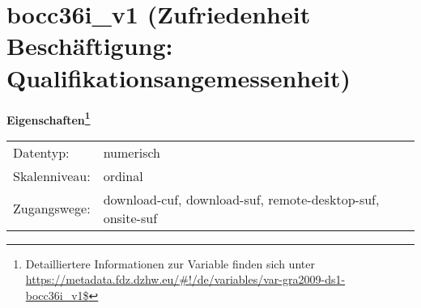 
    \setcounter{footnote}{0}

    \vspace*{-1.8cm}
	\section{bocc36i\_v1 (Zufriedenheit Beschäftigung: Qualifikationsangemessenheit)}
	\label{section:bocc36i_v1}



    \vspace*{0.5cm}
    \noindent\textbf{Eigenschaften\footnote{Detailliertere Informationen zur Variable finden sich unter
		\url{https://metadata.fdz.dzhw.eu/\#!/de/variables/var-gra2009-ds1-bocc36i_v1$}}}\\
	\begin{tabularx}{\hsize}{@{}lX}
	Datentyp: & numerisch \\
	Skalenniveau: & ordinal \\
	Zugangswege: &
	  download-cuf, 
	  download-suf, 
	  remote-desktop-suf, 
	  onsite-suf
 \\
    \end{tabularx}



